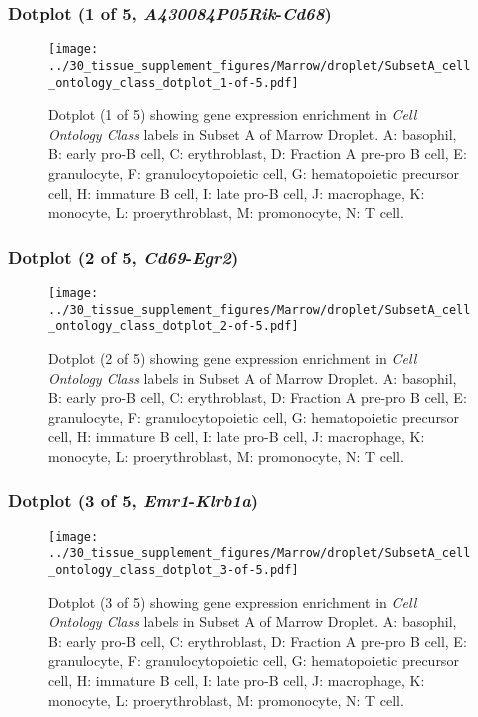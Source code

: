\clearpage

\subsubsection{Dotplot (1 of 5, \emph{A430084P05Rik}-\emph{Cd68})}
\begin{figure}[h]
\centering
\texttt{[image: ../30\_tissue\_supplement\_figures/Marrow/droplet/SubsetA\_cell\_ontology\_class\_dotplot\_1-of-5.pdf]}

\caption{ Dotplot (1 of 5)  showing gene expression enrichment in \emph{Cell Ontology Class} labels in Subset A of Marrow Droplet. A: basophil, B: early pro-B cell, C: erythroblast, D: Fraction A pre-pro B cell, E: granulocyte, F: granulocytopoietic cell, G: hematopoietic precursor cell, H: immature B cell, I: late pro-B cell, J: macrophage, K: monocyte, L: proerythroblast, M: promonocyte, N: T cell.}
\end{figure}


\clearpage

\subsubsection{Dotplot (2 of 5, \emph{Cd69}-\emph{Egr2})}
\begin{figure}[h]
\centering
\texttt{[image: ../30\_tissue\_supplement\_figures/Marrow/droplet/SubsetA\_cell\_ontology\_class\_dotplot\_2-of-5.pdf]}

\caption{ Dotplot (2 of 5)  showing gene expression enrichment in \emph{Cell Ontology Class} labels in Subset A of Marrow Droplet. A: basophil, B: early pro-B cell, C: erythroblast, D: Fraction A pre-pro B cell, E: granulocyte, F: granulocytopoietic cell, G: hematopoietic precursor cell, H: immature B cell, I: late pro-B cell, J: macrophage, K: monocyte, L: proerythroblast, M: promonocyte, N: T cell.}
\end{figure}


\clearpage

\subsubsection{Dotplot (3 of 5, \emph{Emr1}-\emph{Klrb1a})}
\begin{figure}[h]
\centering
\texttt{[image: ../30\_tissue\_supplement\_figures/Marrow/droplet/SubsetA\_cell\_ontology\_class\_dotplot\_3-of-5.pdf]}

\caption{ Dotplot (3 of 5)  showing gene expression enrichment in \emph{Cell Ontology Class} labels in Subset A of Marrow Droplet. A: basophil, B: early pro-B cell, C: erythroblast, D: Fraction A pre-pro B cell, E: granulocyte, F: granulocytopoietic cell, G: hematopoietic precursor cell, H: immature B cell, I: late pro-B cell, J: macrophage, K: monocyte, L: proerythroblast, M: promonocyte, N: T cell.}
\end{figure}


